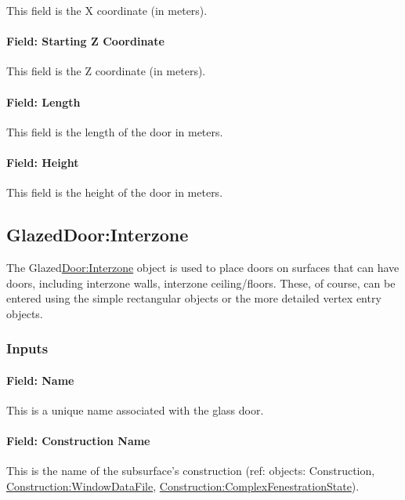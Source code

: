 This field is the X coordinate (in meters).

\paragraph{Field: Starting Z Coordinate}\label{field-starting-z-coordinate-14}

This field is the Z coordinate (in meters).

\paragraph{Field: Length}\label{field-length-14}

This field is the length of the door in meters.

\paragraph{Field: Height}\label{field-height-8}

This field is the height of the door in meters.

\subsection{GlazedDoor:Interzone}\label{glazeddoorinterzone}

The Glazed\hyperref[doorinterzone]{Door:Interzone} object is used to place doors on surfaces that can have doors, including interzone walls, interzone ceiling/floors. These, of course, can be entered using the simple rectangular objects or the more detailed vertex entry objects.

\subsubsection{Inputs}\label{inputs-19-007}

\paragraph{Field: Name}\label{field-name-15-010}

This is a unique name associated with the glass door.

\paragraph{Field: Construction Name}\label{field-construction-name-15}

This is the name of the subsurface's construction (ref: objects: Construction, \hyperref[constructionwindowdatafile]{Construction:WindowDataFile}, \hyperref[constructioncomplexfenestrationstate]{Construction:ComplexFenestrationState}).

